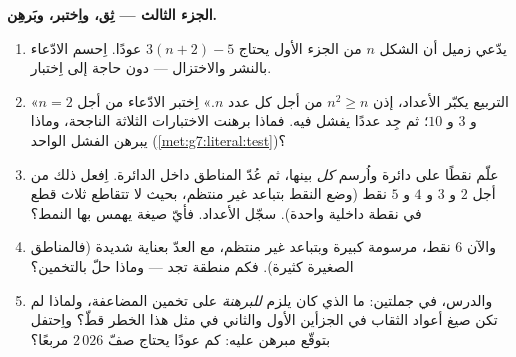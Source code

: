 \begin{problem}
\medskip
\noindent\textbf{الجزء الثالث --- ثِق، واِختبر، وبَرهِن.}
\begin{enumerate}[resume]
  \item يدّعي زميل أن الشكل $n$ من الجزء الأول يحتاج
        $3(n + 2) - 5$ عودًا. اِحسم الادّعاء بالنشر
        والاختزال --- دون حاجة إلى اِختبار.
  \item «التربيع يكبّر الأعداد، إذن $n^2 \geq n$ من أجل
        كل عدد $n$.» اِختبر الادّعاء من أجل $n = 2$ و $3$
        و $10$؛ ثم جِد عددًا يفشل فيه. فماذا برهنت
        الاختبارات الثلاثة الناجحة، وماذا يبرهن الفشل الواحد
        (\cref{met:g7:literal:test})؟
  \item علّم نقطًا على دائرة واُرسم \emph{كل} 
        بينها، ثم عُدّ المناطق داخل الدائرة.
        اِفعل ذلك من أجل $2$ و $3$ و $4$ و $5$ نقط (وضع النقط
        بتباعد غير منتظم، بحيث لا تتقاطع ثلاث قطع في نقطة
        داخلية واحدة). سجّل الأعداد. فأيّ صيغة يهمس بها
        النمط؟
  \item والآن $6$ نقط، مرسومة كبيرة وبتباعد غير منتظم، مع العدّ
        بعناية شديدة (فالمناطق الصغيرة كثيرة). فكم منطقة
        تجد --- وماذا حلّ
        بالتخمين؟
  \item والدرس، في جملتين: ما الذي كان يلزم
        \emph{للبرهنة} على تخمين المضاعفة، ولماذا لم تكن صيغ
        أعواد الثقاب في الجزأين الأول والثاني في مثل هذا
        الخطر قطّ؟ واِحتفل بتوقّع مبرهن عليه: كم عودًا
        يحتاج صفّ $2\,026$ مربعًا؟
\end{enumerate}
\end{problem}
